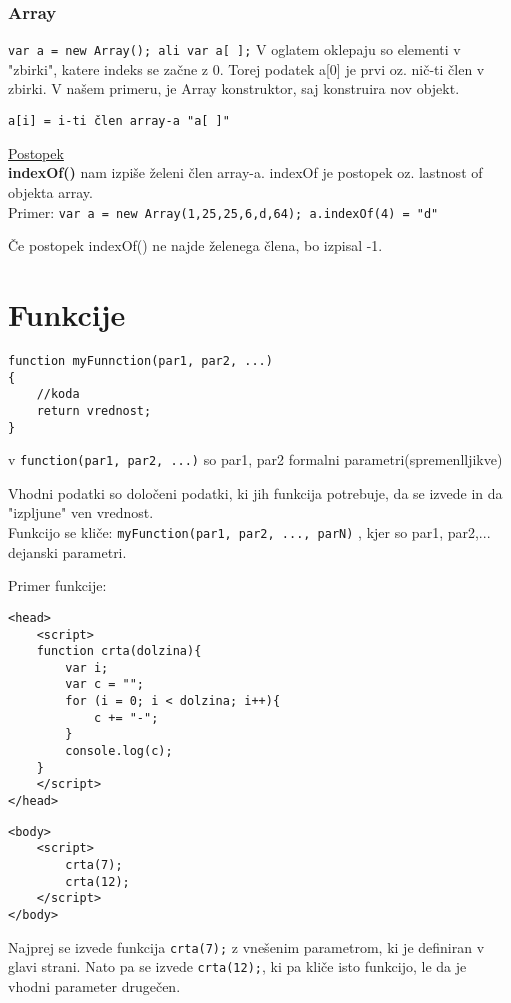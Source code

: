 \subsubsection*{Array}

\texttt{var a = new Array(); ali var a[ ];}
V oglatem oklepaju so elementi v "zbirki", katere indeks se začne z 0. Torej podatek a[0] je prvi oz. nič-ti člen v zbirki.
V našem primeru, je Array konstruktor, saj konstruira nov objekt.

\texttt{a[i] = i-ti člen array-a "a[ ]"}

\underline{Postopek}\\
\textbf{indexOf()} nam izpiše želeni člen array-a. indexOf je postopek oz. lastnost of objekta array.\\
Primer:
\texttt{var a = new Array(1,25,25,6,d,64); a.indexOf(4) = "d"}

Če postopek indexOf() ne najde želenega člena, bo izpisal -1.

\section{Funkcije}

\begin{verbatim}
function myFunnction(par1, par2, ...)
{
    //koda
    return vrednost;
}
\end{verbatim}
v \texttt{function(par1, par2, ...)} so par1, par2 formalni parametri(spremenlljikve)
 
Vhodni podatki so določeni podatki, ki jih funkcija potrebuje, da se izvede in da "izpljune" ven vrednost.\\

Funkcijo se kliče: \texttt{myFunction(par1, par2, ..., parN)} , kjer so par1, par2,... dejanski parametri.

Primer funkcije:
\begin{verbatim}
<head>
    <script>
    function crta(dolzina){
        var i;
        var c = "";
        for (i = 0; i < dolzina; i++){
            c += "-";
        }
        console.log(c);
    }
    </script>
</head>
\end{verbatim}
\newpage
\begin{verbatim}
<body>
    <script>
        crta(7);
        crta(12);
    </script>
</body>
\end{verbatim}

Najprej se izvede funkcija \texttt{crta(7);} z vnešenim parametrom, ki je definiran v glavi strani. Nato pa se izvede \texttt{crta(12);}, ki pa kliče isto funkcijo, le da je vhodni parameter drugečen.

